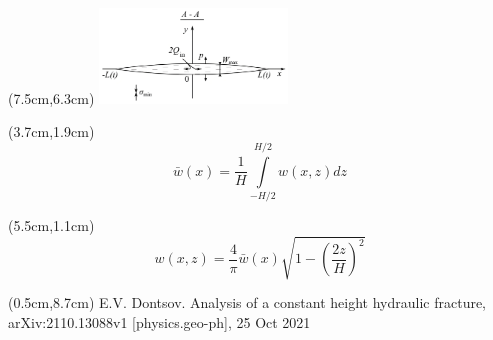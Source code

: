 \documentclass{beamer}
\begin{document}
\begin{frame}
\begin{textblock*}{7cm}(7.5cm,6.3cm)
\includegraphics[width=5cm]{pkn_model_A-A_plane.jpg}
\end{textblock*}

\begin{textblock*}{3.7cm}(3.7cm,1.9cm)
\tiny
$$
\boxed{
\bar{w}(x)=\frac{1}{H}\!\int\limits_{-H/2}^{H/2}{w(x,z)dz}
}
$$
\end{textblock*}

\begin{textblock*}{7cm}(5.5cm,1.1cm)
\tiny
$$
\boxed{
w(x,z)=\frac{4}{\pi}\bar{w}(x)\sqrt{1-\left(\frac{2z}{H}\right)^2}
}
$$
\end{textblock*}

\begin{textblock*}{7cm}(0.5cm,8.7cm)
\scriptsize
\textcolor{lit_gray}{E.V. Dontsov. Analysis of a constant height hydraulic fracture, arXiv:2110.13088v1 [physics.geo-ph], 25 Oct 2021}
\end{textblock*}

\normalsize

\end{frame}
\end{document}
